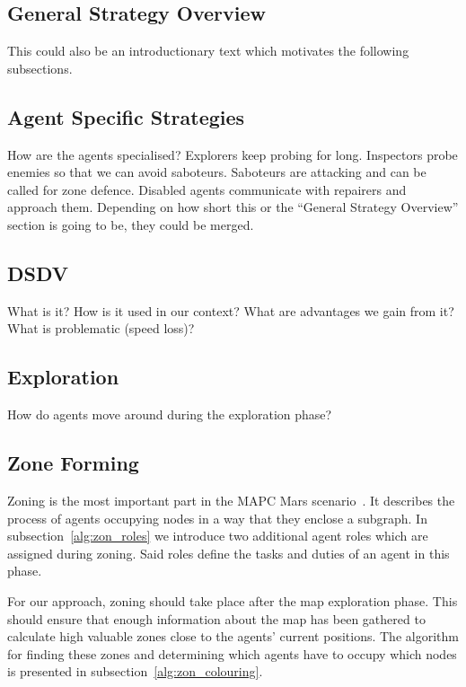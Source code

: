 \subsection{General Strategy Overview}
This could also be an introductionary text which motivates the following subsections.

\subsection{Agent Specific Strategies}
How are the agents specialised? Explorers keep probing for long. Inspectors probe enemies so that we can avoid saboteurs. Saboteurs are attacking and can be called for zone defence. Disabled agents communicate with repairers and approach them. Depending on how short this or the ``General Strategy Overview'' section is going to be, they could be merged.

\subsection{DSDV}
What is it? How is it used in our context? What are advantages we gain from it? What is problematic (speed loss)?

\subsection{Exploration}
How do agents move around during the exploration phase?

\subsection{Zone Forming}
Zoning is the most important part in the MAPC Mars scenario~\cite{ahlbrecht_mapc_2014}.%
It describes the process of agents occupying nodes in a way that they enclose a subgraph. In subsection~\ref{alg:zon_roles} we introduce two additional agent roles which are assigned during zoning. Said roles define the tasks and duties of an agent in this phase.

For our approach, zoning should take place after the map exploration phase. This should ensure that enough information about the map has been gathered to calculate high valuable zones close to the agents' current positions. The algorithm for finding these zones and determining which agents have to occupy which nodes is presented in subsection~\ref{alg:zon_colouring}.

